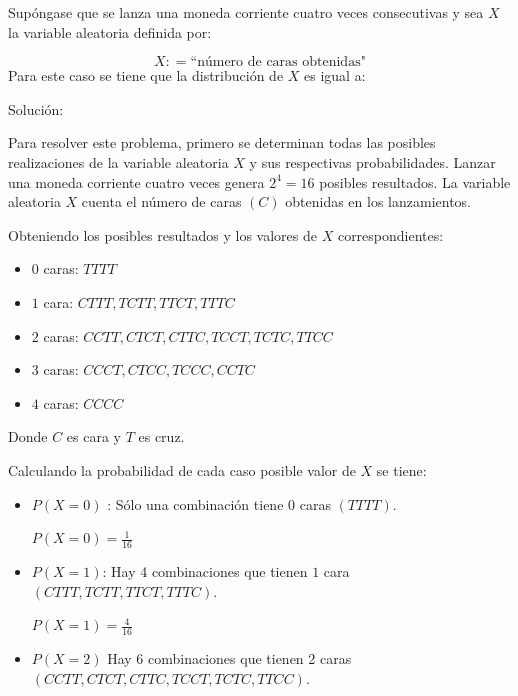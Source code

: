 \documentclass[
  us-letterpaper,
]{scrreprt}
\theoremstyle{plain}
\theoremstyle{plain}
\theoremstyle{definition}
\theoremstyle{remark}
\begin{document}
\begin{tcolorbox}[enhanced jigsaw, titlerule=0mm, opacityback=0, coltitle=black, bottomrule=.15mm, colbacktitle=quarto-callout-caution-color!10!white, toprule=.15mm, colback=white, arc=.35mm, colframe=quarto-callout-caution-color-frame, leftrule=.75mm, bottomtitle=1mm, left=2mm, toptitle=1mm, opacitybacktitle=0.6, breakable, title={Ejemplo (\textbf{\emph{función de distribución}})}, rightrule=.15mm]

Supóngase que se lanza una moneda corriente cuatro veces consecutivas y
sea \(X\) la variable aleatoria definida por:

\[
X : = \text{``número de caras obtenidas"}
\] Para este caso se tiene que la distribución de \(X\) es igual a:

Solución:

Para resolver este problema, primero se determinan todas las posibles
realizaciones de la variable aleatoria \(X\) y sus respectivas
probabilidades. Lanzar una moneda corriente cuatro veces genera
\(2^4 = 16\) posibles resultados. La variable aleatoria \(X\) cuenta el
número de caras \((C)\) obtenidas en los lanzamientos.

Obteniendo los posibles resultados y los valores de \(X\)
correspondientes:

\begin{itemize}
\item
  \(0\) caras: \(TTTT\)
\item
  \(1\) cara: \(CTTT, TCTT, TTCT, TTTC\)
\item
  \(2\) caras: \(CCTT, CTCT, CTTC, TCCT, TCTC, TTCC\)
\item
  \(3\) caras: \(CCCT, CTCC, TCCC, CCTC\)
\item
  \(4\) caras: \(CCCC\)
\end{itemize}

Donde \(C\) es cara y \(T\) es cruz.

Calculando la probabilidad de cada caso posible valor de \(X\) se tiene:

\begin{itemize}
\item
  \(P(X = 0)\) : Sólo una combinación tiene 0 caras \((TTTT)\).

  \(P(X = 0) = \frac{1}{16}\)
\item
  \(P(X = 1)\): Hay 4 combinaciones que tienen \(1\) cara
  \((CTTT, TCTT, TTCT, TTTC)\).

  \(P(X = 1) = \frac{4}{16}\)
\item
  \(P(X = 2)\) Hay \(6\) combinaciones que tienen 2 caras
  \((CCTT, CTCT, CTTC, TCCT, TCTC, TTCC).\)


\end{itemize}
\end{tcolorbox}
\end{document}
